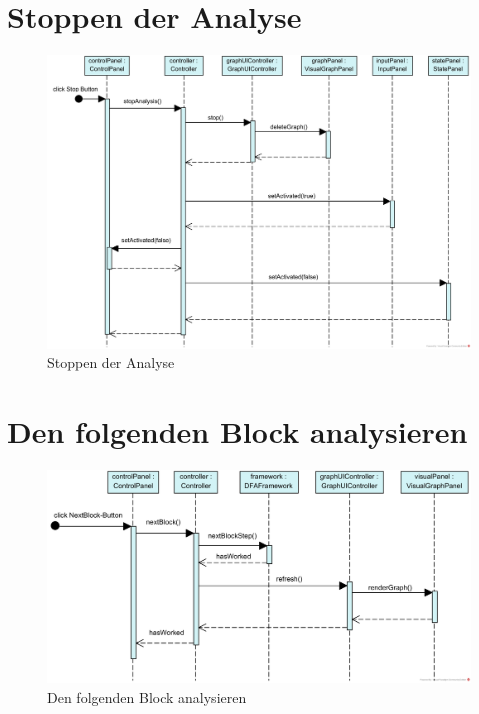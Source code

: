 \section*{Stoppen der Analyse}
\begin{figure}[H]
  \centering
    \includegraphics[width=1\textwidth]{Sequenzdiagramme/AnalysisStop}
  \caption{Stoppen der Analyse}
  \label{fig:anaStop}
\end{figure}
\newpage

\section*{Den folgenden Block analysieren}
\begin{figure}[H]
  \centering
    \includegraphics[width=1\textwidth]{Sequenzdiagramme/NextBlock}
  \caption{Den folgenden Block analysieren}
  \label{fig:nextblock}
\end{figure}
\newpage

